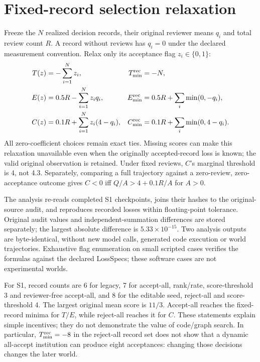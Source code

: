 \documentclass{article}
\begin{document}
\section{Fixed-record selection relaxation}
\label{sec:selection-relaxation}
Freeze the $N$ realized decision records, their original reviewer means $q_i$
and total review count $R$. A record without reviews has $q_i=0$ under the
declared measurement convention. Relax only its acceptance flag $z_i\in\{0,1\}$:
\begin{align}
 T(z)&=-\sum_{i=1}^N z_i,& T_{\min}^{\rm rec}&=-N,\\
 E(z)&=0.5R-\sum_{i=1}^N z_iq_i,& E_{\min}^{\rm rec}&=0.5R+\sum_i\min(0,-q_i),\\
 C(z)&=0.1R+\sum_{i=1}^N z_i(4-q_i),& C_{\min}^{\rm rec}&=0.1R+\sum_i\min(0,4-q_i).
\end{align}
All zero-coefficient choices remain exact ties. Missing scores can make this
relaxation unavailable even when the originally accepted-record loss is known;
the valid original observation is retained. Under fixed reviews, $C$'s marginal
threshold is 4, not 4.3. Separately, comparing a full trajectory against a
zero-review, zero-acceptance outcome gives $C<0$ iff $Q/A>4+0.1R/A$ for $A>0$.

The analysis re-reads completed S1 checkpoints, joins their hashes to the
original-source audit, and reproduces recorded losses within floating-point
tolerance. Original audit values and independent-summation differences are
stored separately; the largest absolute difference is $5.33\times10^{-15}$.
Two analysis outputs are byte-identical, without new model calls, generated
code execution or world trajectories. Exhaustive flag enumeration on small
scripted cases verifies the formulas against the declared LossSpecs; these
software cases are not experimental worlds.

For S1, record counts are 6 for legacy, 7 for accept-all, rank/rate,
score-threshold 3 and reviewer-free accept-all, and 8 for the editable seed,
reject-all and score-threshold 4. The largest original mean score is $11/3$.
Accept-all reaches the fixed-record minima for $T/E$, while reject-all reaches
it for $C$. These statements explain simple incentives; they do not demonstrate
the value of code/graph search. In particular, $T_{\min}^{\rm rec}=-8$ in the
reject-all record set does not show that a dynamic all-accept institution can
produce eight acceptances: changing those decisions changes the later world.
\end{document}
